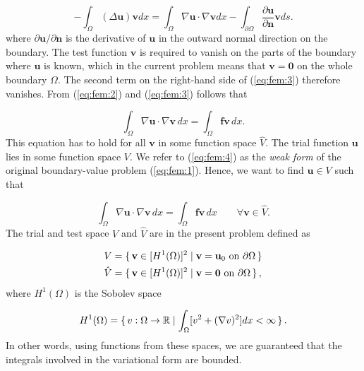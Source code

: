 \documentclass[a4paper,11pt,oneside]{book}
\begin{document}
\begin{equation}
\label{eq:fem:3}
- \int_\Omega (\Delta \mathbf{u}) \mathbf{v} dx =
\int_\Omega \nabla \mathbf{u} \cdot \nabla \mathbf{v} dx
- \int_{\partial \Omega} \frac{\partial \mathbf{u}}{\partial \mathbf{n}} \mathbf{v} ds.
\end{equation}
where $\partial \mathbf{u}/\partial \mathbf{n}$ is the derivative of $\mathbf{u}$ in the outward normal direction on the boundary. The test function $\mathbf{v}$ is required to vanish on the parts of the boundary where $\mathbf{u}$ is known, which in the current problem means that $\mathbf{v} = \mathbf{0}$ on the whole boundary $\Omega$. The second term on the right-hand side of (\ref{eq:fem:3}) therefore vanishes. From (\ref{eq:fem:2}) and (\ref{eq:fem:3}) follows that

\begin{equation}
\label{eq:fem:4}
\int_\Omega \nabla \mathbf{u} \cdot \nabla \mathbf{v} \, dx = \int_\Omega \mathbf{f} \mathbf{v} \, dx. 
\end{equation}
This equation has to hold for all $\mathbf{v}$ in some function space $\hat{V}$. The trial function $\mathbf{u}$ lies in some function space $V$. We refer to (\ref{eq:fem:4}) as the \emph{weak form} of the original boundary-value problem (\ref{eq:fem:1}).
Hence, we want to find $\mathbf{u} \in V$ such that

\begin{equation}
\label{eq:fem:5}
\int_\Omega \nabla \mathbf{u} \cdot \nabla \mathbf{v} \, dx = \int_\Omega \mathbf{f} \mathbf{v} \, dx \qquad \forall \mathbf{v} \in \hat{V}.
\end{equation}
The trial and test space $V$ and $\hat{V}$ are in the present problem defined as

\begin{align}
V &= \set{\mathbf{v} \in [H^1(\Omega)]^2 | \mathbf{v} = \mathbf{u}_0 \text{ on } \partial \Omega}  \\
\hat{V} &= \set{\mathbf{v} \in [H^1(\Omega)]^2 | \mathbf{v} = \mathbf{0} \text{ on } \partial \Omega}, 
\end{align}
where $H^1(\Omega)$ is the Sobolev space

\begin{equation}
H^1(\Omega) = \set {v: \Omega \rightarrow \mathbb{R}  | \int_\Omega [v^2 + (\nabla v)^2]dx < \infty }. 
\end{equation}
In other words, using functions from these spaces, we are guaranteed that the integrals involved in the variational form are bounded. \\
\end{document}
